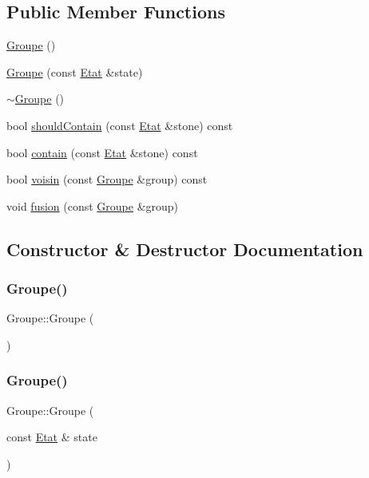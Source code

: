 \subsection*{Public Member Functions}
\begin{DoxyCompactItemize}
\item 
\hyperlink{class_groupe_a413ae785f3c78828334b2f3140d2dd7a}{Groupe} ()
\item 
\hyperlink{class_groupe_a196bbbbc7e9b682caa4671c5bc72c6f3}{Groupe} (const \hyperlink{class_etat}{Etat} \&state)
\item 
\hyperlink{class_groupe_a99dd414922635dcc0585aabb2a330f63}{$\sim$\+Groupe} ()
\item 
bool \hyperlink{class_groupe_a51ae2500f67ac071215ba3ff49e91b17}{should\+Contain} (const \hyperlink{class_etat}{Etat} \&stone) const
\item 
bool \hyperlink{class_groupe_aa8fa9be4c3edb6e1ec436dbefb7018f9}{contain} (const \hyperlink{class_etat}{Etat} \&stone) const
\item 
bool \hyperlink{class_groupe_a13537bf2de72a097dd9ee102d14686d5}{voisin} (const \hyperlink{class_groupe}{Groupe} \&group) const
\item 
void \hyperlink{class_groupe_a4d3e09aee8899dd93c37b5a35a191e2e}{fusion} (const \hyperlink{class_groupe}{Groupe} \&group)
\end{DoxyCompactItemize}


\subsection{Constructor \& Destructor Documentation}
\mbox{\label{class_groupe_a413ae785f3c78828334b2f3140d2dd7a}} 
\subsubsection{\texorpdfstring{Groupe()}{Groupe()}\hspace{0.1cm}{\footnotesize\ttfamily [1/2]}}
{\footnotesize\ttfamily Groupe\+::\+Groupe (\begin{DoxyParamCaption}{ }\end{DoxyParamCaption})}

\mbox{\label{class_groupe_a196bbbbc7e9b682caa4671c5bc72c6f3}} 
\subsubsection{\texorpdfstring{Groupe()}{Groupe()}\hspace{0.1cm}{\footnotesize\ttfamily [2/2]}}
{\footnotesize\ttfamily Groupe\+::\+Groupe (\begin{DoxyParamCaption}\item[{const \hyperlink{class_etat}{Etat} \&}]{state }\end{DoxyParamCaption})}

